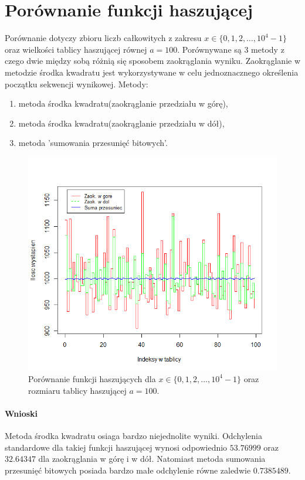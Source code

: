 \documentclass{article}
\begin{document}
\section{Porównanie funkcji haszującej} \label{p1}
	Porównanie dotyczy zbioru liczb całkowitych z zakresu $x \in \{0,1,2,\ldots,10^4 - 1\}$ oraz wielkości tablicy haszującej równej $a = 100$. Porównywane są 3 metody z czego dwie między sobą różnią się sposobem zaokrąglania wyniku. Zaokrąglanie w metodzie środka kwadratu jest wykorzystywane w celu jednoznacznego określenia początku sekwencji wynikowej. Metody:
	\begin{enumerate}
		\item metoda środka kwadratu(zaokrąglanie przedziału w górę),
		\item metoda środka kwadratu(zaokrąglanie przedziału w dół),
		\item metoda 'sumowania przesunięć bitowych'.		
	\end{enumerate}
	\begin{figure}[h]
		\includegraphics[width=\linewidth]{1.png}
		\caption{Porównanie funkcji haszujących dla $x \in \{0,1,2,\ldots,10^4 - 1\}$ oraz rozmiaru tablicy haszującej $a = 100$.}
	\end{figure}
	\paragraph{Wnioski}	
	Metoda środka kwadratu osiaga bardzo niejednolite wyniki. Odchylenia standardowe dla takiej funkcji haszującej wynosi odpowiednio $53.76999$ oraz $32.64347$ dla zaokrąglania w górę i w dół. Natomiast metoda sumowania przesunięć bitowych posiada bardzo małe odchylenie równe zaledwie $0.7385489$. 
\end{document}
